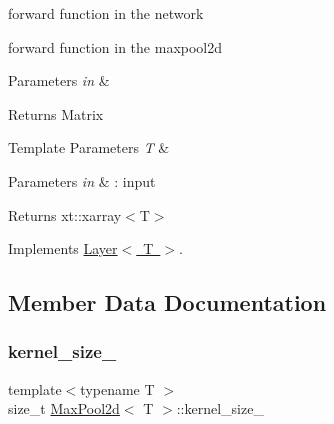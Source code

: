 forward function in the network 

forward function in the maxpool2d


\begin{DoxyParams}{Parameters}
{\em in} & \\
\hline
\end{DoxyParams}
\begin{DoxyReturn}{Returns}
Matrix
\end{DoxyReturn}

\begin{DoxyTemplParams}{Template Parameters}
{\em T} & \\
\hline
\end{DoxyTemplParams}

\begin{DoxyParams}{Parameters}
{\em in} & \+: input \\
\hline
\end{DoxyParams}
\begin{DoxyReturn}{Returns}
xt\+::xarray$<$\+T$>$ 
\end{DoxyReturn}


Implements \mbox{\hyperlink{class_layer_ab15b665c86974b1cf1d7ba4e309cb0e5}{Layer$<$ T $>$}}.



\subsection{Member Data Documentation}
\mbox{\label{class_max_pool2d_a665aa0f6561a8a7883d2746efeb68f88}} 
\subsubsection{\texorpdfstring{kernel\_size\_}{kernel\_size\_}}
{\footnotesize\ttfamily template$<$typename T $>$ \\
size\+\_\+t \mbox{\hyperlink{class_max_pool2d}{Max\+Pool2d}}$<$ T $>$\+::kernel\+\_\+size\+\_\+\hspace{0.3cm}{\ttfamily [protected]}}

\mbox{\label{class_max_pool2d_ab1dd4757718ee42e14bb7fdcf2a2be2c}} 
